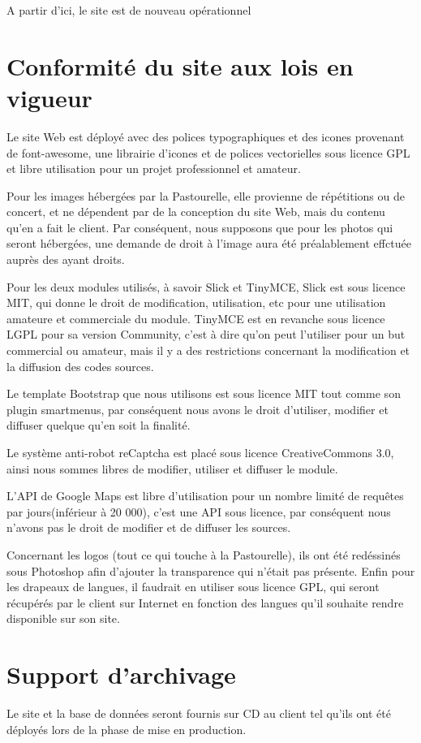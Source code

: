 \documentclass[11pt]{report}
\begin{document}
\par A partir d'ici, le site est de nouveau opérationnel

\section{Conformité du site aux lois en vigueur}
Le site Web est déployé avec des polices typographiques et des icones provenant
de font-awesome, une librairie d'icones et de polices vectorielles sous licence
GPL et libre utilisation pour un projet professionnel et amateur. \\

\par Pour les images hébergées par la Pastourelle, elle provienne de répétitions
ou de concert, et ne dépendent par de la conception du site Web, mais du contenu
qu'en a fait le client. Par conséquent, nous supposons que pour les photos qui
seront hébergées, une demande de droit à l'image aura été préalablement effctuée
auprès des ayant droits. \\

\par Pour les deux modules utilisés, à savoir Slick et TinyMCE, Slick est sous
licence MIT, qui donne le droit de modification, utilisation, etc pour une
utilisation amateure et commerciale du module. TinyMCE est en revanche sous
licence LGPL pour sa version Community, c'est à dire qu'on peut l'utiliser pour
un but commercial ou amateur, mais il y a des restrictions concernant la
modification et la diffusion des codes sources. \\

\par Le template Bootstrap que nous utilisons est sous licence MIT tout comme
son plugin smartmenus, par conséquent nous avons le droit d'utiliser, modifier
et diffuser quelque qu'en soit la finalité. \\

\par Le système anti-robot reCaptcha est placé sous licence CreativeCommons 3.0,
ainsi nous sommes libres de modifier, utiliser et diffuser le module. \\

\par L'API de Google Maps est libre d'utilisation pour un nombre limité de
requêtes par jours(inférieur à 20 000), c'est une API sous licence, par
conséquent nous n'avons pas le droit de modifier et de diffuser les sources.

\par Concernant les logos (tout ce qui touche à la Pastourelle), ils ont été
redéssinés sous Photoshop afin d'ajouter la transparence qui n'était pas
présente. Enfin pour les drapeaux de langues, il faudrait en utiliser sous
licence GPL, qui seront récupérés par le client sur Internet en fonction des
langues qu'il souhaite rendre disponible sur son site.

\section{Support d'archivage}
Le site et la base de données seront fournis sur CD au client tel qu'ils
ont été déployés lors de la phase de mise en production.
\end{document}
